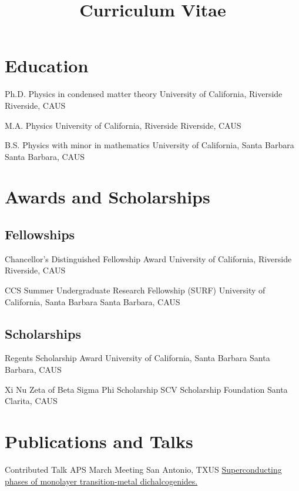 \documentclass[10pt,letter]{moderncv}
\title{Curriculum Vitae}
\begin{document}
  \maketitle

  \section{Education}

    {Ph.D. Physics in condensed matter theory}
    {University of California, Riverside}
    {Riverside, CA}{US}{}

    {M.A. Physics}
    {University of California, Riverside}
    {Riverside, CA}{US}{}

    {B.S. Physics with minor in mathematics}
    {University of California, Santa Barbara}
    {Santa Barbara, CA}{US}{}

  \section{Awards and Scholarships}

  \subsection{Fellowships}

    {Chancellor's Distinguished Fellowship Award}
    {University of California, Riverside}
    {Riverside, CA}{US}{}

    {CCS Summer Undergraduate Research Fellowship (SURF)}
    {University of California, Santa Barbara}
    {Santa Barbara, CA}{US}{}

  \subsection{Scholarships}

    {Regents Scholarship Award}
    {University of California, Santa Barbara}
    {Santa Barbara, CA}{US}{}

    {Xi Nu Zeta of Beta Sigma Phi Scholarship}
    {SCV Scholarship Foundation}
    {Santa Clarita, CA}{US}{}

  \section{Publications and Talks}

    {Contributed Talk}
    {APS March Meeting}
    {San Antonio, TX}{US}
    {\href{https://evansosenko.com/deck-dichalcogenides-superconductivity/}
      {Superconducting phases of monolayer transition-metal dichalcogenides.}}
\end{document}
